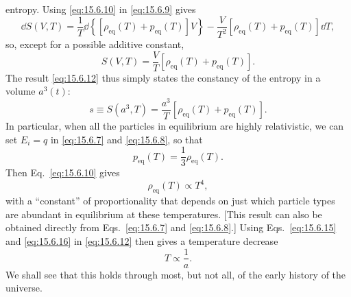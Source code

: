 entropy. Using \eqref{eq:15.6.10} in \eqref{eq:15.6.9} gives
\[
  \dd S(V,T)
  =
  \frac1T
  \dd\!\left\{
    [\rho_{\mathrm{eq}}(T)+p_{\mathrm{eq}}(T)]V
  \right\}
  -
  \frac{V}{T^2}
  [\rho_{\mathrm{eq}}(T)+p_{\mathrm{eq}}(T)]\dd T,
\]
so, except for a possible additive constant,
\begin{equation}
  S(V,T)
  =
  \frac VT[\rho_{\mathrm{eq}}(T)+p_{\mathrm{eq}}(T)].
  \tag{15.6.13}\label{eq:15.6.13}
\end{equation}
The result \eqref{eq:15.6.12} thus simply states the constancy of the entropy
in a volume \(a^3(t)\):
\begin{equation}
  s
  \equiv
  S(a^3,T)
  =
  \frac{a^3}{T}[\rho_{\mathrm{eq}}(T)+p_{\mathrm{eq}}(T)].
  \tag{15.6.14}\label{eq:15.6.14}
\end{equation}
In particular, when all the particles in equilibrium are highly relativistic,
we can set \(E_i=q\) in \eqref{eq:15.6.7} and \eqref{eq:15.6.8}, so that
\begin{equation}
  p_{\mathrm{eq}}(T)=\frac13\rho_{\mathrm{eq}}(T).
  \tag{15.6.15}\label{eq:15.6.15}
\end{equation}
Then Eq.~\eqref{eq:15.6.10} gives
\begin{equation}
  \rho_{\mathrm{eq}}(T)\propto T^4,
  \tag{15.6.16}\label{eq:15.6.16}
\end{equation}
with a ``constant'' of proportionality that depends on just which particle
types are abundant in equilibrium at these temperatures. [This result can
also be obtained directly from Eqs.~\eqref{eq:15.6.7} and
\eqref{eq:15.6.8}.] Using Eqs.~\eqref{eq:15.6.15} and
\eqref{eq:15.6.16} in \eqref{eq:15.6.12} then gives a temperature decrease
\begin{equation}
  T\propto\frac1a.
  \tag{15.6.17}\label{eq:15.6.17}
\end{equation}
We shall see that this holds through most, but not all, of the early history
of the universe.

